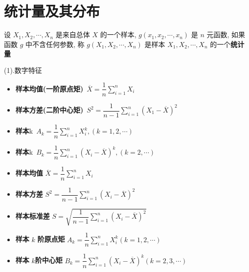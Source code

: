 \section{统计量及其分布}
\begin{definition}
	设 $X_{1},X_{2},\cdots,X_{n}$ 是来自总体 $X$ 的一个样本,
	$g(x_{1}, x_{2}, \cdots, x_{n})$ 是 $n$ 元函数, 如果函数 $g$ 中不含任何参数, 称 $g(X_{1},X_{2},\cdots,X_{n})$ 是样本 $X_{1},X_{2},\cdots,X_{n}$ 的一个\textbf{统计量}
	
	
	(1).数字特征
	\begin{itemize}
		\item \textbf{样本均值(一阶原点矩)}\ $\overline{X}=\dfrac{1}{n}\sum\limits_{i=1}^{n}X_{i}$
		\item \textbf{样本方差(二阶中心矩)}\ $S^2=\dfrac{1}{n-1}\sum\limits_{i=1}^{n}(X_{1}-\overline{X})^2$
		\item \textbf{样本}k\ $A_{k}=\dfrac{1}{n}\sum\limits_{i=1}^{n}X_{i}^{k},(k=1,2,\cdots)$
		\item \textbf{样本}k\ $B_{k}=\dfrac{1}{n}\sum\limits_{i=1}^{n}(X_{i}-\overline{X})^{k},(k=2,\cdots)$
	\end{itemize}
\end{definition}

\begin{definition}[样本数字特征]
	\begin{itemize}
		\item \textbf{样本均值} $\overline{X} = \dfrac{1}{n}\sum\limits_{i = 1}^{n}X_{i}$
		\item \textbf{样本方差} $S^{2} =\dfrac{1}{n-1}\sum\limits_{i = 1}^{n}(X_{i}-\overline{X})^2$
		\item \textbf{样本标准差} $S = \sqrt{\dfrac{1}{n-1}\sum\limits_{i = 1}^{n}(X_{i} - \overline{X})^{2}}$
		\item \textbf{样本} $k$ \textbf{阶原点矩}  $A_{k} = \dfrac{1}{n}\sum\limits_{i = 1}^{n}X_{i}^{k} (k = 1,2,\cdots)$
		\item \textbf{样本} $k$\textbf{阶中心矩} $B_{k} = \dfrac{1}{n}\sum\limits_{i = 1}^{n}(X_{i}-\overline{X})^{k} (k = 2, 3, \cdots)$
	\end{itemize}
\end{definition}

